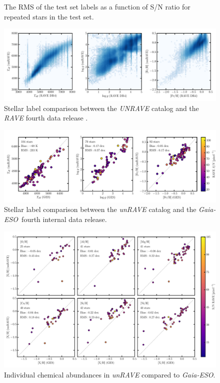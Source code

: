 \documentclass[preprint,trackchanges]{aastex}
\newcommand{\project}[1]{\textsl{#1}}
\newcommand{\ges}{\project{Gaia-ESO}}
\begin{document}
\begin{figure}[p]
\caption{The RMS of the test set labels as a function of S/N ratio for repeated stars in the test set.\label{fig:test-set-repeats}}
\end{figure}

\begin{figure}[p]
\includegraphics[width=\textwidth]{figures/dr4-comparison.pdf}
\caption{Stellar label comparison between the \project{UNRAVE} catalog and the \project{RAVE} fourth data release \citep{Kordopatis_2013}.\label{fig:rave-dr4-comparison}}
\end{figure}



\begin{figure}[p]
\includegraphics[width=\textwidth]{figures/ges-comparison.pdf}
\caption{Stellar label comparison between the \project{unRAVE} catalog and the \ges\ fourth internal data release.\label{fig:ges-stellar-parameters}}
\end{figure}


\begin{figure}[p]
\includegraphics[width=\textwidth]{figures/ges-abundances.pdf}
\caption{Individual chemical abundances in \project{unRAVE} compared to \ges.\label{fig:ges-abundances}}
\end{figure}
\end{document}
